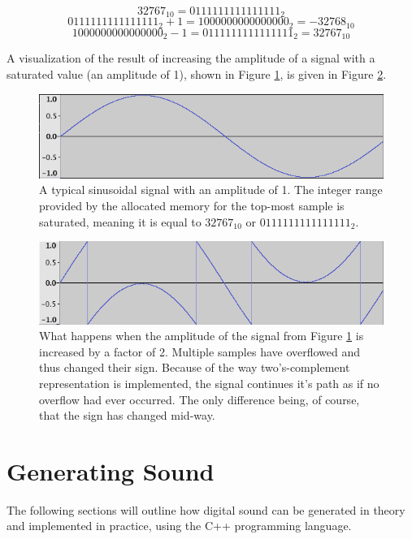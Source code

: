 \documentclass[12pt,twoside]{report}
\begin{document}
$$32767_{10} = 0111111111111111_{2}$$
$$0111111111111111_{2} + 1 = 1000000000000000_{2} = -32768_{10}$$
$$1000000000000000_{2} - 1 = 0111111111111111_{2} = 32767_{10}$$

A visualization of the result of increasing the amplitude of a signal with a saturated value (an amplitude of 1), shown in Figure \ref{fig:no-over}, is given in Figure \ref{fig:over}.

\begin{figure}[h!]
  \centering
  \includegraphics[scale=0.5]{img/no-over}
  \caption{A typical sinusoidal signal with an amplitude of 1. The integer range provided by the allocated memory for the top-most sample is saturated, meaning it is equal to $32767_{10}$ or $0111111111111111_{2}$.}
  \label{fig:no-over}
\end{figure}

\begin{figure}[h!]
  \centering
  \includegraphics[scale=0.5]{img/over}
  \caption{What happens when the amplitude of the signal from Figure \ref{fig:no-over} is increased by a factor of 2. Multiple samples have overflowed and thus changed their sign. Because of the way two's-complement representation is implemented, the signal continues it's path as if no overflow had ever occurred. The only difference being, of course, that the sign has changed mid-way. }
  \label{fig:over}
\end{figure}

\chapter{Generating Sound}

The following sections will outline how digital sound can be generated in theory and implemented in practice, using the C++ programming language.
\end{document}
